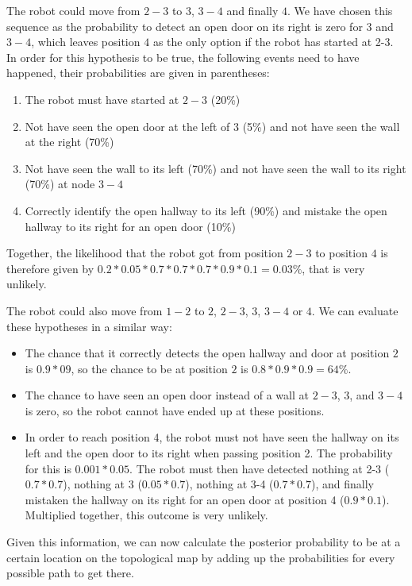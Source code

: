 The robot could move from $2-3$ to $3$, $3-4$ and finally $4$. We have chosen this sequence as the probability to detect an open door on its right is zero for $3$ and $3-4$, which leaves position $4$ as the only option if the robot has started at 2-3. In order for this hypothesis to be true, the following events need to have happened, their probabilities are given in parentheses:
\begin{enumerate}
\item The robot must have started at $2-3$ (20\%)
\item Not have seen the open door at the left of $3$ (5\%) and not have seen the wall at the right (70\%)
\item Not have seen the wall to its left (70\%) and not have seen the wall to its right (70\%) at node $3-4$
\item Correctly identify the open hallway to its left (90\%) and mistake the open hallway to its right for an open door (10\%)
\end{enumerate}
Together, the likelihood that the robot got from position $2-3$ to position $4$ is therefore given by $0.2*0.05*0.7*0.7*0.7*0.9*0.1=0.03\%$, that is very unlikely.


The robot could also move from $1-2$ to $2$, $2-3$, $3$, $3-4$ or $4$. We can evaluate these hypotheses in a similar way:
\begin{itemize}
\item The chance that it correctly detects the open hallway and door at position $2$ is $0.9*09$, so the chance to be at position $2$ is
$0.8*0.9*0.9=64\%$.
\item The chance to have seen an open door instead of a wall at $2-3$, $3$, and $3-4$ is zero, so the robot cannot have ended up at these positions.
\item In order to reach position 4, the robot must not have seen the hallway on its left and the open door to its right when passing position 2. The probability for this is $0.001*0.05$. The robot must then have detected nothing at 2-3 ($0.7*0.7$), nothing at 3 ($0.05*0.7$), nothing at 3-4 ($0.7*0.7$), and finally mistaken the hallway on its right for an open door at position 4 ($0.9*0.1$). Multiplied together, this outcome is very unlikely.
\end{itemize}

Given this information, we can now calculate the posterior probability to be at a certain location on the topological map by adding up the probabilities for every possible path to get there. 

